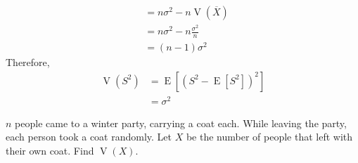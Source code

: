 \documentclass[titlepage, fleqn, a4paper, 12pt, twoside]{article}
\theoremstyle{definition}
\theoremstyle{theorem}
\DeclareMathOperator{\expct}{\mathrm{E}}
\DeclareMathOperator{\var}{\mathrm{V}}
\begin{document}
\begin{solution}
\begin{align*}
                                                 & = n \sigma^2 - n \var\left( \overline{X} \right)                                                                          \\
                                                 & = n \sigma^2 - n \frac{\sigma^2}{n}                                                                                       \\
                                                 & = (n - 1) \sigma^2
	\end{align*}
	Therefore,
	\begin{align*}
		\var\left( S^2 \right) & = \expct\left[ \left( S^2 - \expct\left[ S^2 \right] \right)^2 \right] \\
                                       & = \sigma^2
	\end{align*}
\end{solution}

\begin{question}
	$n$ people came to a winter party, carrying a coat each.
	While leaving the party, each person took a coat randomly.
	Let $X$ be the number of people that left with their own coat.
	Find $\var(X)$.
\end{question}
\end{document}
